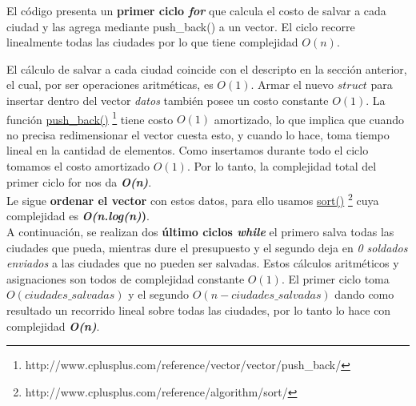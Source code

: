 
El c\'odigo presenta un \textbf{primer ciclo \emph{for}} que calcula el costo de salvar a cada ciudad y las agrega mediante push_back() a un vector. El ciclo recorre linealmente todas las ciudades por lo que tiene complejidad $O(n)$. 

El c\'alculo de salvar a cada ciudad coincide con el descripto en la secci\'on anterior, el cual, por ser operaciones aritm\'eticas, es $O(1)$. Armar el nuevo $struct$ para insertar dentro del vector \emph{datos} tambi\'en posee un costo constante $O(1)$. La funci\'on \href{http://www.cplusplus.com/reference/vector/vector/push_back/}{push\_back()} \footnote{http://www.cplusplus.com/reference/vector/vector/push_back/} tiene costo $O(1)$ amortizado, lo que implica que cuando no precisa redimensionar el vector cuesta esto, y cuando lo hace, toma tiempo lineal en la cantidad de elementos. Como insertamos durante todo el ciclo tomamos el costo amortizado $O(1)$.
Por lo tanto, la complejidad total del primer ciclo for nos da \textbf{\textit{O(n)}}.\\

Le sigue \textbf{ordenar el vector} con estos datos, para ello usamos \href{http://www.cplusplus.com/reference/algorithm/sort/}{sort()} \footnote{http://www.cplusplus.com/reference/algorithm/sort/} cuya complejidad es \textbf{\textit{O(n.log(n)})}.\\

A continuaci\'on, se realizan dos \textbf{\'ultimo ciclos \emph{while}} el primero salva todas las ciudades que pueda, mientras dure el presupuesto y el segundo deja en \emph{0 soldados enviados} a las ciudades que no pueden ser salvadas. Estos c\'alculos aritm\'eticos y asignaciones son todos de complejidad constante $O(1)$. El primer ciclo toma $O(ciudades\_salvadas)$ y el segundo $O(n-ciudades\_salvadas)$ dando como resultado un recorrido lineal sobre todas las ciudades, por lo tanto lo hace con complejidad \textbf{\textit{O(n)}}.\\



